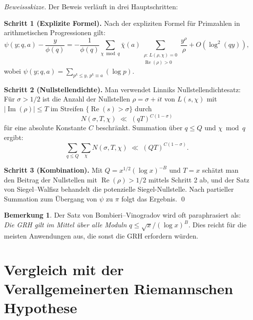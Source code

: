 \documentclass[12pt,a4paper]{amsart}
\theoremstyle{definition}
\newtheorem{bemerkung}[theorem]{Bemerkung}
\begin{document}
\textit{Beweissskizze.}
Der Beweis verläuft in drei Hauptschritten:

\textbf{Schritt 1 (Explizite Formel).}  Nach der expliziten Formel für
Primzahlen in arithmetischen Progressionen gilt:
\[
  \psi(y;q,a) - \frac{y}{\phi(q)}
  = -\frac{1}{\phi(q)}\sum_{\chi\bmod q}\bar\chi(a)
    \sum_{\substack{\rho:\, L(\rho,\chi)=0\\\operatorname{Re}(\rho)>0}}
    \frac{y^{\rho}}{\rho}
  + O(\log^2(qy)),
\]
wobei $\psi(y;q,a) = \sum_{p^k \leq y,\, p^k \equiv a}(\log p)$.

\textbf{Schritt 2 (Nullstellendichte).}
Man verwendet Linniks Nullstellendichtesatz: Für $\sigma > 1/2$ ist die
Anzahl der Nullstellen $\rho = \sigma + it$ von $L(s,\chi)$ mit
$|\operatorname{Im}(\rho)| \leq T$ im Streifen $\{\operatorname{Re}(s) > \sigma\}$ durch
\[
  N(\sigma, T, \chi) \;\ll\; (qT)^{C(1-\sigma)}
\]
für eine absolute Konstante $C$ beschränkt.  Summation über $q \leq Q$
und $\chi\bmod q$ ergibt:
\[
  \sum_{q \leq Q}\sum_\chi N(\sigma,T,\chi)
  \;\ll\; (QT)^{C(1-\sigma)}.
\]

\textbf{Schritt 3 (Kombination).}
Mit $Q = x^{1/2}(\log x)^{-B}$ und $T = x$ schätzt man den Beitrag der
Nullstellen mit $\operatorname{Re}(\rho) > 1/2$ mittels Schritt 2 ab, und der Satz von
Siegel--Walfisz behandelt die potenzielle Siegel-Nullstelle.  Nach partieller
Summation zum Übergang von $\psi$ zu $\pi$ folgt das Ergebnis.  \qed

\begin{bemerkung}
  Der Satz von Bombieri--Vinogradov wird oft paraphrasiert als:
  \emph{Die GRH gilt im Mittel über alle Moduln $q \leq \sqrt{x}/(\log x)^B$.}
  Dies reicht für die meisten Anwendungen aus, die sonst die GRH erfordern
  würden.
\end{bemerkung}

\section{Vergleich mit der Verallgemeinerten Riemannschen Hypothese}
\end{document}

